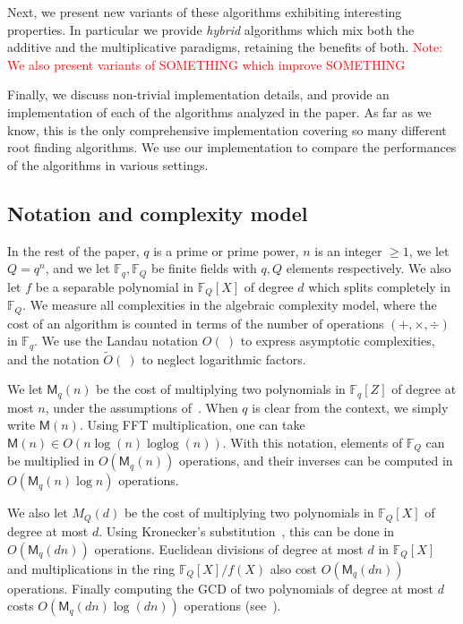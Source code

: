 \documentclass{article}
\newcommand{\ff}[1]{\mathbb{F}_{#1}}
\DeclareMathOperator{\loglog}{loglog}
\newcommand{\bigOt}{\tilde{O}}
\newcommand{\Mul}{\mathsf{M}}
\newcounter{algo}
\newcommand{\Notes}[1]{\textcolor{red}{Note: #1}}
\begin{document}
Next, we present new variants of these algorithms exhibiting
interesting properties. In particular we provide \emph{hybrid}
algorithms which mix both the additive and the multiplicative
paradigms, retaining the benefits of both. \Notes{We also present
  variants of SOMETHING which improve SOMETHING}

Finally, we discuss non-trivial implementation details, and provide an
implementation of each of the algorithms analyzed in the paper. As far
as we know, this is the only comprehensive implementation covering so
many different root finding algorithms. We use our implementation to
compare the performances of the algorithms in various settings.


\subsection{Notation and complexity model}
\label{sec:compl-model-fund}

In the rest of the paper, $q$ is a prime or prime power, $n$ is an
integer $≥1$, we let $Q=q^n$, and we let $\ff{q},\ff{Q}$ be finite
fields with $q,Q$ elements respectively.  We also let $f$ be a
separable polynomial in $\ff{Q}[X]$ of degree $d$ which splits
completely in $\ff{Q}$. We measure all complexities in the algebraic
complexity model, where the cost of an algorithm is counted in terms
of the number of operations $(+,\times,\div)$ in $\ff{q}$. We use the
Landau notation $O(\ )$ to express asymptotic complexities, and the
notation $\bigOt(\ )$ to neglect logarithmic factors.

We let $\Mul_q(n)$ be the cost of multiplying two polynomials in
$\ff{q}[Z]$ of degree at most $n$, under the assumptions
of~\cite[Chapter~8.3]{Gathen2003}. When $q$ is clear from the context,
we simply write $\Mul(n)$.  Using FFT multiplication, one can take
$\Mul(n)∈ O(n\log(n)\loglog(n))$.  With this notation, elements of
$\ff{Q}$ can be multiplied in $O(\Mul_q(n))$ operations, and their
inverses can be computed in $O(\Mul_q(n)\log n)$ operations.

We also let $M_Q(d)$ be the cost of multiplying two polynomials in
$\ff{Q}[X]$ of degree at most $d$.  Using Kronecker's
substitution~\cite{moenck76,kaltofen87,Gathen2003,GathenS92,harvey09},
this can be done in $O(\Mul_q(dn))$ operations. Euclidean divisions of
degree at most $d$ in $\ff{Q}[X]$ and multiplications in the ring
$\ff{Q}[X]/f(X)$ also cost $O(\Mul_q(dn))$ operations. Finally
computing the GCD of two polynomials of degree at most $d$ costs
$O(\Mul_q(dn)\log(dn))$ operations
(see~\cite[Th.~11.5]{Gathen2003}).
\end{document}
